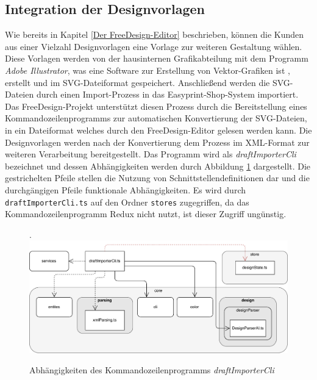 \subsection{Integration der Designvorlagen}
\label{Kommandozeilenprogramme}
Wie bereits in Kapitel \ref{Der FreeDesign-Editor} beschrieben, können die Kunden aus einer Vielzahl Designvorlagen eine Vorlage zur weiteren Gestaltung wählen. 
Diese Vorlagen werden von der hausinternen Grafikabteilung mit dem Programm \emph{Adobe Illustrator}, was eine Software zur Erstellung von Vektor-Grafiken ist \autocite[vgl.][]{Adobe:Illustrator}, erstellt und im SVG-Dateiformat gespeichert. Anschließend werden die SVG-Dateien durch einen Import-Prozess in das Easyprint-Shop-System importiert. Das FreeDesign-Projekt unterstützt diesen Prozess durch die Bereitstellung eines Kommandozeilenprogramms zur automatischen Konvertierung der SVG-Dateien, in ein Dateiformat welches durch den FreeDesign-Editor gelesen werden kann. Die Designvorlagen werden nach der Konvertierung dem Prozess im XML-Format zur weiteren Verarbeitung bereitgestellt. 
Das Programm wird als \emph{draftImporterCli} bezeichnet und dessen Abhängigkeiten werden durch Abbildung \ref{fig:DesignImport} dargestellt.
Die gestrichelten Pfeile stellen die Nutzung von Schnittstellendefinitionen dar und die durchgängigen Pfeile funktionale Abhängigkeiten. Es wird durch \lstinline|draftImporterCli.ts| auf den Ordner \lstinline|stores| zugegriffen, da das Kommandozeilenprogramm Redux nicht nutzt, ist dieser Zugriff ungünstig.


\begin{figure}[H]
    \centering
    \caption{Abhängigkeiten des Kommandozeilenprogramms \emph{draftImporterCli}}.
    \includegraphics[width=.9\textwidth]{diagrams/Ist-Architektur/draftImporter-analysis.pdf}
    \label{fig:DesignImport}
\end{figure}


